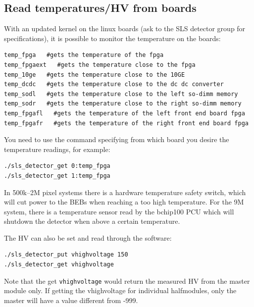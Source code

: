 \documentclass{article}
\begin{document}
\subsection{Read temperatures/HV from boards}

With an updated kernel on the linux boards (ask to the SLS detector group for specifications), it is possible to monitor the temperature on the boards: 
\begin{verbatim}
temp_fpga   #gets the temperature of the fpga
temp_fpgaext   #gets the temperature close to the fpga
temp_10ge   #gets the temperature close to the 10GE
temp_dcdc   #gets the temperature close to the dc dc converter
temp_sodl   #gets the temperature close to the left so-dimm memory
temp_sodr   #gets the temperature close to the right so-dimm memory
temp_fpgafl   #gets the temperature of the left front end board fpga
temp_fpgafr   #gets the temperature of the right front end board fpga

\end{verbatim}

You need to use the command specifying from which board you desire the temperature readings, for example:
\begin{verbatim}
./sls_detector_get 0:temp_fpga
./sls_detector_get 1:temp_fpga
\end{verbatim}
In 500k--2M pixel systems there is a hardware temperature safety switch, which will cut power to the BEBs when reaching a too high temperature. For the 9M system, there is a temperature sensor read by the bchip100 PCU which will shutdown the detector when above a certain temperature.
 
The HV can also be set and read through the software:
\begin{verbatim}
./sls_detector_put vhighvoltage 150
./sls_detector_get vhighvoltage 
\end{verbatim}
Note that the get {\tt{vhighvoltage}} would return the measured HV from the master module only. If getting the vhighvoltage for individual halfmodules, only the master will have a value different from -999.

\appendix
\end{document}
